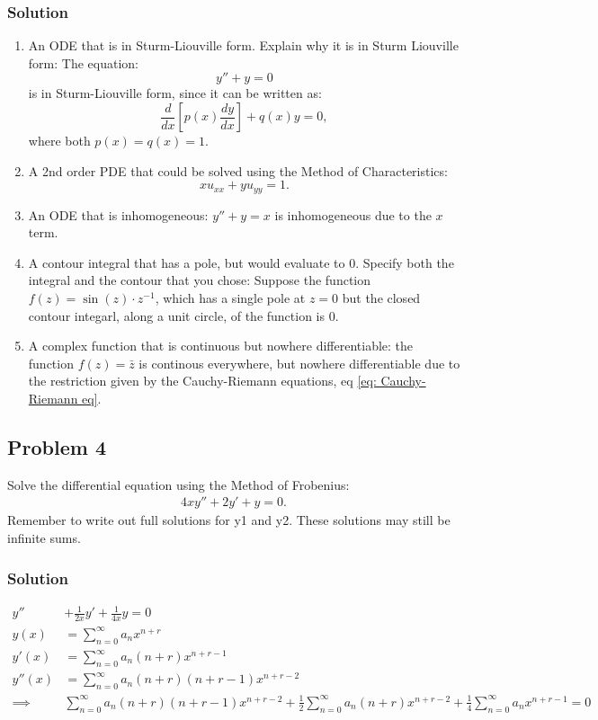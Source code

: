 \subsubsection*{Solution}
\begin{enumerate}
    \item An ODE that is in Sturm-Liouville form. Explain why it is in Sturm Liouville form: The equation: $$y'' + y = 0$$ is in Sturm-Liouville form, since it can be written as: $$\frac{d}{dx}\left[p(x)\frac{dy}{dx}\right] + q(x)y = 0,$$ where both $p(x) = q(x) = 1$.
    \item A 2nd order PDE that could be solved using the Method of Characteristics: $$xu_{xx} + yu_{yy} = 1.$$
    \item An ODE that is inhomogeneous: $y'' + y = x$ is inhomogeneous due to the $x$ term.
    \item A contour integral that has a pole, but would evaluate to 0. Specify both the integral and the contour that you chose: Suppose the function $f(z) = \sin(z)\cdot z^{-1}$, which has a single pole at $z = 0$ but the closed contour integarl, along a unit circle, of the function is 0.
    \item A complex function that is continuous but nowhere differentiable: the function $f(z) = \bar{z}$ is continous everywhere, but nowhere differentiable due to the restriction given by the Cauchy-Riemann equations, eq \eqref{eq: Cauchy-Riemann eq}.
\end{enumerate}
\subsection*{Problem 4}
Solve the differential equation using the Method of Frobenius:
\begin{align*}
    4xy'' + 2y' +y = 0.
\end{align*}Remember to write out full solutions for y1 and y2. These solutions may still be infinite sums.

\subsubsection*{Solution}
\begin{align*}
    y'' &+ \frac{1}{2x}y' + \frac{1}{4x}y = 0\\
    y(x) &= \sum_{n=0}^\infty a_nx^{n + r}\\
    y'(x) &= \sum_{n=0}^\infty a_n(n+r)x^{n + r - 1}\\
    y''(x) &= \sum_{n=0}^\infty a_n(n+r)(n+r-1)x^{n + r - 2}\\
    \implies& \sum_{n=0}^\infty a_n(n+r)(n+r-1)x^{n + r - 2}+ \frac{1}{2}\sum_{n=0}^\infty a_n(n+r)x^{n + r - 2} + \frac{1}{4}\sum_{n=0}^\infty a_nx^{n + r - 1} = 0\\
\end{align*}

